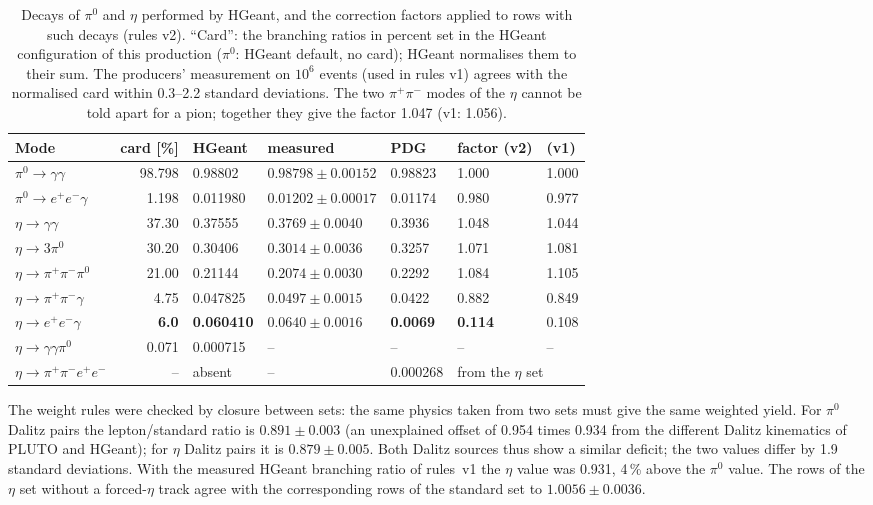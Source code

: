 \documentclass[11pt,a4paper]{article}
\newcommand{\piz}{\ensuremath{\pi^{0}}\xspace}
\newcommand{\ee}{\ensuremath{e^{+}e^{-}}\xspace}
\newcommand{\pipi}{\ensuremath{\pi^{+}\pi^{-}}\xspace}
\newcommand{\ppee}{\ensuremath{\pi^{+}\pi^{-}e^{+}e^{-}}\xspace}
\begin{document}
\begin{table}[H]
\centering
\caption{Decays of \piz and $\eta$ performed by HGeant, and the correction factors applied to
rows with such decays (rules v2). ``Card'': the branching ratios in percent set in the HGeant
configuration of this production (\piz: HGeant default, no card); HGeant normalises them to
their sum. The producers' measurement on $10^6$ events (used in rules v1) agrees with the
normalised card within 0.3--2.2 standard deviations. The two \pipi modes of the $\eta$ cannot be
told apart for a pion; together they give the factor 1.047 (v1: 1.056).}
\label{tab:hgeant}
\small
\begin{tabular}{@{}l r l l l l l@{}}
\toprule
Mode & card [\%] & HGeant & measured & PDG & factor (v2) & (v1) \\
\midrule
$\piz\to\gamma\gamma$     & 98.798 & 0.98802 & $0.98798\pm0.00152$ & 0.98823 & 1.000 & 1.000 \\
$\piz\to\ee\gamma$        & 1.198 & 0.011980 & $0.01202\pm0.00017$ & 0.01174 & 0.980 & 0.977 \\
$\eta\to\gamma\gamma$     & 37.30 & 0.37555 & $0.3769\pm0.0040$ & 0.3936 & 1.048 & 1.044 \\
$\eta\to3\piz$            & 30.20 & 0.30406 & $0.3014\pm0.0036$ & 0.3257 & 1.071 & 1.081 \\
$\eta\to\pipi\piz$        & 21.00 & 0.21144 & $0.2074\pm0.0030$ & 0.2292 & 1.084 & 1.105 \\
$\eta\to\pipi\gamma$      & 4.75 & 0.047825 & $0.0497\pm0.0015$ & 0.0422 & 0.882 & 0.849 \\
$\eta\to\ee\gamma$        & \textbf{6.0} & \textbf{0.060410} & $0.0640\pm0.0016$ & \textbf{0.0069} & \textbf{0.114} & 0.108 \\
$\eta\to\gamma\gamma\piz$ & 0.071 & 0.000715 & -- & -- & -- & -- \\
$\eta\to\ppee$            & -- & absent & -- & 0.000268 & \multicolumn{2}{l}{from the $\eta$ set} \\
\bottomrule
\end{tabular}
\end{table}

The weight rules were checked by closure between sets: the same physics taken from two sets
must give the same weighted yield. For \piz Dalitz pairs the lepton/standard ratio is
$0.891\pm0.003$ (an unexplained offset of 0.954 times 0.934 from the different Dalitz
kinematics of PLUTO and HGeant); for $\eta$ Dalitz pairs it is $0.879\pm0.005$. Both Dalitz sources thus
show a similar deficit; the two values differ by 1.9 standard deviations. With the measured HGeant
branching ratio of rules~v1 the $\eta$ value was 0.931, 4\,\% above the \piz value. The rows of the $\eta$
set without a forced-$\eta$ track agree with the corresponding rows of the standard set to
$1.0056\pm0.0036$.
\end{document}
